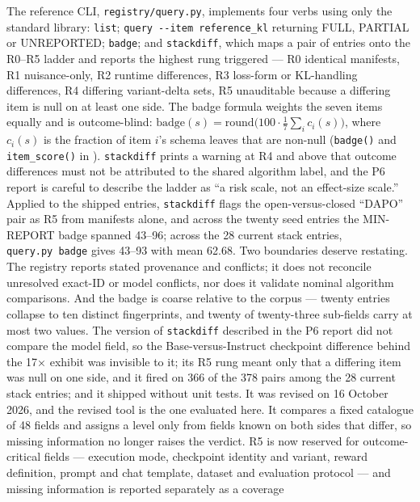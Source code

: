 \documentclass[12pt,a4paper]{report}
\DeclareRobustCommand{\longtok}[1]{\texttt{\seqsplit{#1}}}
\begin{document}
The reference CLI, \texttt{registry/query.py}, implements four verbs
using only the standard library: \texttt{list};
\texttt{query\ -\/-item\ reference\_kl} returning FULL, PARTIAL or
UNREPORTED; \texttt{badge}; and \texttt{stackdiff}, which maps a pair of
entries onto the R0--R5 ladder and reports the highest rung triggered
--- R0 identical manifests, R1 nuisance-only, R2 runtime differences, R3
loss-form or KL-handling differences, R4 differing variant-delta sets,
R5 unauditable because a differing item is null on at least one side.
The badge formula weights the seven items equally and is outcome-blind:
\(\mathrm{badge}(s) = \mathrm{round}\bigl(100 \cdot \tfrac{1}{7} \sum_i c_i(s)\bigr)\),
where \(c_i(s)\) is the fraction of item \(i\)'s schema leaves that are
non-null (\texttt{badge()} and \texttt{item\_score()} in
\longtok{platform\_hybrid/registry/query.py}). \texttt{stackdiff} prints
a warning at R4 and above that outcome differences must not be
attributed to the shared algorithm label, and the P6 report is careful
to describe the ladder as ``a risk scale, not an effect-size scale.''
Applied to the shipped entries, \texttt{stackdiff} flags the
open-versus-closed ``DAPO'' pair as R5 from manifests alone, and across
the twenty seed entries the MIN-REPORT badge spanned 43--96; across the
28 current stack entries, \texttt{query.py\ badge} gives 43--93 with
mean 62.68. Two boundaries deserve restating. The registry reports
stated provenance and conflicts; it does not reconcile unresolved
exact-ID or model conflicts, nor does it validate nominal algorithm
comparisons. And the badge is coarse relative to the corpus --- twenty
entries collapse to ten distinct fingerprints, and twenty of
twenty-three sub-fields carry at most two values. The version of
\texttt{stackdiff} described in the P6 report did not compare the model
field, so the Base-versus-Instruct checkpoint difference behind the 17×
exhibit was invisible to it; its R5 rung meant only that a differing
item was null on one side, and it fired on 366 of the 378 pairs among
the 28 current stack entries; and it shipped without unit tests. It was
revised on 16 October 2026, and the revised tool is the one evaluated
here. It compares a fixed catalogue of 48 fields and assigns a level
only from fields known on both sides that differ, so missing information
no longer raises the verdict. R5 is now reserved for outcome-critical
fields --- execution mode, checkpoint identity and variant, reward
definition, prompt and chat template, dataset and evaluation protocol
--- and missing information is reported separately as a coverage
\end{document}
